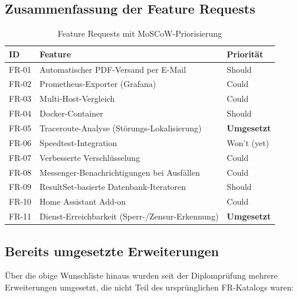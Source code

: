 \subsection{Zusammenfassung der Feature Requests}

\begin{table}[h]
\centering
\begin{tabular}{|l|l|l|}
\hline
\textbf{ID} & \textbf{Feature} & \textbf{Priorität} \\
\hline
FR-01 & Automatischer PDF-Versand per E-Mail & Should \\
FR-02 & Prometheus-Exporter (Grafana) & Could \\
FR-03 & Multi-Host-Vergleich & Could \\
FR-04 & Docker-Container & Should \\
FR-05 & Traceroute-Analyse (Störungs-Lokalisierung) & \textbf{Umgesetzt} \\
FR-06 & Speedtest-Integration & Won't (yet) \\
FR-07 & Verbesserte Verschlüsselung & Could \\
FR-08 & Messenger-Benachrichtigungen bei Ausfällen & Could \\
FR-09 & ResultSet-basierte Datenbank-Iteratoren & Should \\
FR-10 & Home Assistant Add-on & Could \\
FR-11 & Dienst-Erreichbarkeit (Sperr-/Zensur-Erkennung) & \textbf{Umgesetzt} \\
\hline
\end{tabular}
\caption{Feature Requests mit MoSCoW-Priorisierung}
\label{tab:featurerequests}
\end{table}

\subsection{Bereits umgesetzte Erweiterungen}

Über die obige Wunschliste hinaus wurden seit der Diplomprüfung mehrere Erweiterungen
umgesetzt, die nicht Teil des ursprünglichen FR-Katalogs waren:

